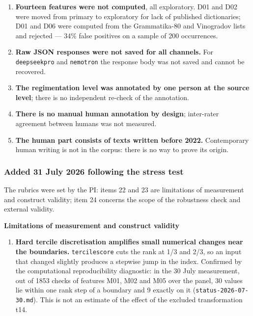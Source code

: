 \documentclass[11pt,a4paper]{article}
\renewcommand{\_}{\textunderscore\allowbreak}
\begin{document}
\begin{enumerate}
\item[17.] \textbf{Fourteen features were not computed}, all exploratory. D01 and D02 were moved from primary to exploratory for lack of published dictionaries; D01 and D06 were computed from the Grammatika-80 and Vinogradov lists and rejected — 34\% false positives on a sample of 200 occurrences.
\item[18.] \textbf{Raw JSON responses were not saved for all channels.} For \texttt{deepseek\_pro} and \texttt{nemotron} the response body was not saved and cannot be recovered.
\item[19.] \textbf{The regimentation level was annotated by one person at the source level}; there is no independent re-check of the annotation.
\item[20.] \textbf{There is no manual human annotation by design}; inter-rater agreement between humans was not measured.
\item[21.] \textbf{The human part consists of texts written before 2022.} Contemporary human writing is not in the corpus: there is no way to prove its origin.
\end{enumerate}

\subsubsection{Added 31 July 2026 following the stress test}

The rubrics were set by the PI: items 22 and 23 are limitations of measurement and construct validity; item 24 concerns the scope of the robustness check and external validity.

\textbf{Limitations of measurement and construct validity}

\begin{enumerate}
\item[22.] \textbf{Hard tercile discretisation amplifies small numerical changes near the boundaries.} \texttt{tercile\_score} cuts the rank at 1/3 and 2/3, so an input that changed slightly produces a stepwise jump in the index. Confirmed by the computational reproducibility diagnostic: in the 30 July measurement, out of 1853 checks of features M01, M02 and M05 over the panel, 30 values lie within one rank step of a boundary and 9 exactly on it (\texttt{status-\allowbreak{}2026-\allowbreak{}07-\allowbreak{}30.md}). This is not an estimate of the effect of the excluded transformation t14.
\end{enumerate}
\end{document}
